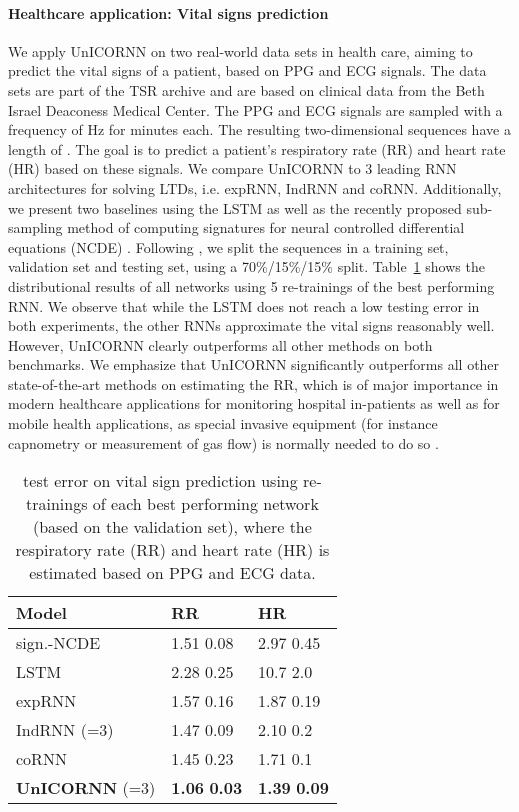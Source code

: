 \documentclass{article}
\newcommand{\Tref}[1]{Table~\ref{#1}}
\begin{document}
\paragraph{Healthcare application: Vital signs prediction}
We apply UnICORNN on two real-world data sets in health care, aiming to predict the vital signs of a patient, based on PPG and ECG signals. The data sets are part of the TSR archive \cite{ai_healthcare} and are based on clinical data from the Beth Israel Deaconess Medical Center. The PPG and ECG signals are sampled with a frequency of Hz for  minutes each. The resulting two-dimensional sequences have a length of . The goal is to predict a patient's respiratory rate (RR) and heart rate (HR) based on these signals. We compare UnICORNN to 3 leading RNN architectures for solving LTDs, i.e. expRNN, IndRNN and coRNN. Additionally, we present two baselines using the LSTM as well as the recently proposed sub-sampling method of computing signatures for neural controlled differential equations (NCDE) \cite{log_ode}. Following \cite{log_ode}, we split the  sequences in a training set, validation set and testing set, using a 70\%/15\%/15\% split. \Tref{tab:medical} shows the distributional results of all networks using 5 re-trainings of the best performing RNN. We observe that while the LSTM does not reach a low  testing error in both experiments, the other RNNs approximate the vital signs reasonably well. However, UnICORNN clearly outperforms all other methods on both benchmarks. We emphasize that UnICORNN significantly outperforms all other state-of-the-art methods on estimating the RR, which is of major importance in modern healthcare applications for monitoring hospital in-patients as well as for mobile health applications, as special invasive equipment (for instance capnometry or measurement of gas flow) is normally needed to do so \cite{rr}.
\begin{table}[ht]
\caption{ test error on vital sign prediction using  re-trainings of each best performing network (based on the validation set), where the respiratory rate (RR) and heart rate (HR) is estimated based on PPG and ECG data.}
\label{tab:medical}
\vskip 0.15in
\begin{center}
\begin{small}
\begin{sc}
\begin{tabular}{lll}
\toprule
Model & RR & HR \\
\midrule
sign.-NCDE & 1.51  0.08 &  2.97  0.45  \\
LSTM  & 2.28  0.25 & 10.7  2.0  \\
expRNN & 1.57  0.16 & 1.87  0.19 \\
IndRNN (=3) & 1.47  0.09 & 2.10  0.2 \\
coRNN & 1.45  0.23 & 1.71  0.1 \\
\textbf{UnICORNN} (=3) &  \textbf{1.06}  \textbf{0.03} & \textbf{1.39}  \textbf{0.09}\\
\bottomrule
\end{tabular}
\end{sc}
\end{small}
\end{center}
\vskip -0.1in
\end{table}
\end{document}
